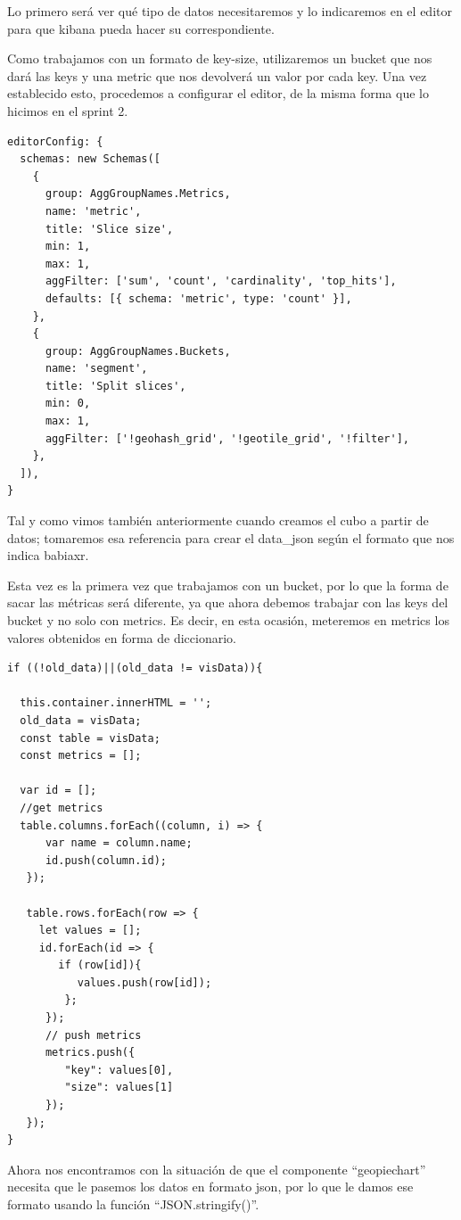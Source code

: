 \documentclass[a4paper, 12pt]{book}
\begin{document}
Lo primero será ver qué tipo de datos necesitaremos y lo indicaremos en el editor para que kibana pueda hacer su correspondiente.

Como trabajamos con un formato de key-size, utilizaremos un bucket que nos dará las keys y una metric que nos devolverá un valor por cada key. Una vez establecido esto, procedemos a configurar el editor, de la misma forma que lo hicimos en el sprint 2.

\begin{lstlisting}[frame=single]
editorConfig: {
  schemas: new Schemas([
    {
      group: AggGroupNames.Metrics,
      name: 'metric',
      title: 'Slice size',
      min: 1,
      max: 1,
      aggFilter: ['sum', 'count', 'cardinality', 'top_hits'],
      defaults: [{ schema: 'metric', type: 'count' }],
    },
    {
      group: AggGroupNames.Buckets,
      name: 'segment',
      title: 'Split slices',
      min: 0,
      max: 1,
      aggFilter: ['!geohash_grid', '!geotile_grid', '!filter'],
    },
  ]),
}
\end{lstlisting}

Tal y como vimos también anteriormente cuando creamos el cubo a partir de datos; tomaremos esa referencia para crear el data\_json según el formato que nos indica babiaxr.

Esta vez es la primera vez que trabajamos con un bucket, por lo que la forma de sacar las métricas será diferente, ya que ahora debemos trabajar con las keys del bucket y no solo con metrics. Es decir, en esta ocasión, meteremos en metrics los valores obtenidos en forma de diccionario.

\begin{lstlisting}[frame=single]
if ((!old_data)||(old_data != visData)){

  this.container.innerHTML = '';
  old_data = visData;
  const table = visData;
  const metrics = [];

  var id = [];
  //get metrics
  table.columns.forEach((column, i) => {
      var name = column.name;
      id.push(column.id);
   });

   table.rows.forEach(row => {
     let values = [];
     id.forEach(id => {
        if (row[id]){
           values.push(row[id]);
         };
      });
      // push metrics
      metrics.push({
         "key": values[0],
         "size": values[1]
      });
   });
}
\end{lstlisting}

Ahora nos encontramos con la situación de que el componente “geopiechart” necesita que le pasemos los datos en formato json, por lo que le damos ese formato usando la función “JSON.stringify()”.
\end{document}
